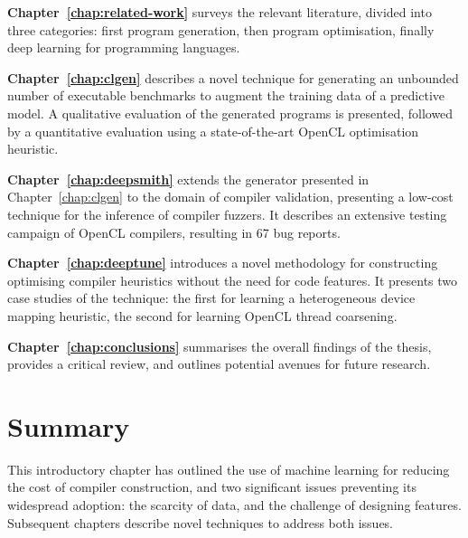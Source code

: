 \textbf{Chapter~\ref{chap:related-work}} surveys the relevant literature, divided into three categories: first program generation, then program optimisation, finally deep learning for programming languages.

\textbf{Chapter~\ref{chap:clgen}} describes a novel technique for generating an unbounded number of executable benchmarks to augment the training data of a predictive model. A qualitative evaluation of the generated programs is presented, followed by a quantitative evaluation using a state-of-the-art OpenCL optimisation heuristic.

\textbf{Chapter~\ref{chap:deepsmith}} extends the generator presented in Chapter~\ref{chap:clgen} to the domain of compiler validation, presenting a low-cost technique for the inference of compiler fuzzers. It describes an extensive testing campaign of OpenCL compilers, resulting in 67 bug reports.

\textbf{Chapter~\ref{chap:deeptune}} introduces a novel methodology for constructing optimising compiler heuristics without the need for code features. It presents two case studies of the technique: the first for learning a heterogeneous device mapping heuristic, the second for learning OpenCL thread coarsening.

\textbf{Chapter~\ref{chap:conclusions}} summarises the overall findings of the thesis, provides a critical review, and outlines potential avenues for future research.


\section{Summary}

This introductory chapter has outlined the use of machine learning for reducing the cost of compiler construction, and two significant issues preventing its widespread adoption: the scarcity of data, and the challenge of designing features. Subsequent chapters describe novel techniques to address both issues.
